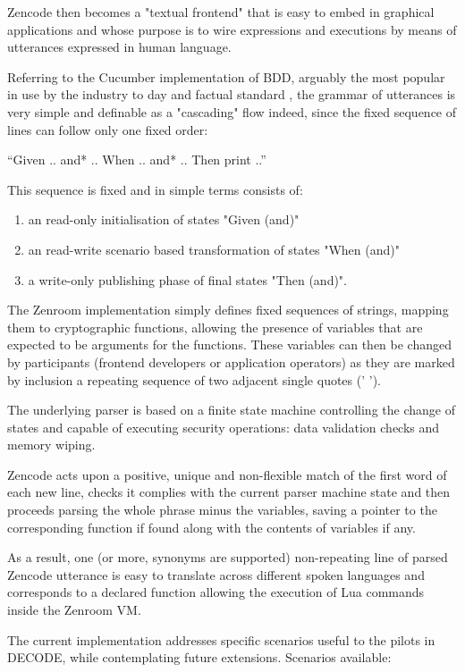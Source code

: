 \documentclass{svproc}
\begin{document}
Zencode then becomes a "textual frontend" that is easy to embed in
graphical applications and whose purpose is to wire expressions and
executions by means of utterances expressed in human language.

Referring to the Cucumber implementation of BDD, arguably the most
popular in use by the industry to day and factual standard
\cite{wynne2012}, the grammar of utterances is very simple and
definable as a "cascading" flow indeed, since the fixed sequence of
lines can follow only one fixed order:

\enquote{Given .. and* .. When .. and* .. Then print ..}

This sequence is fixed and in simple terms consists of:

\begin{enumerate}
\item an read-only initialisation of states "Given (and)"
\item an read-write scenario based transformation of states "When (and)"
\item a write-only publishing phase of final states "Then (and)".
\end{enumerate}

The Zenroom implementation simply defines fixed sequences of strings, mapping them to cryptographic functions, allowing the presence of variables that are expected to be arguments for the functions. These variables can then be changed by participants (frontend developers or application operators) as they are marked by inclusion a repeating sequence of two adjacent single quotes ('  ').

The underlying parser is based on a finite state machine controlling
the change of states and capable of executing security operations:
data validation checks and memory wiping.

Zencode acts upon a positive, unique and non-flexible match of the
first word of each new line, checks it complies with the current
parser machine state and then proceeds parsing the whole phrase minus
the variables, saving a pointer to the corresponding function if found
along with the contents of variables if any.

As a result, one (or more, synonyms are supported) non-repeating line
of parsed Zencode utterance is easy to translate across different
spoken languages and corresponds to a declared function allowing the
execution of Lua commands inside the Zenroom VM.

The current implementation addresses specific scenarios useful to the
pilots in DECODE, while contemplating future extensions. Scenarios
available:
\end{document}
